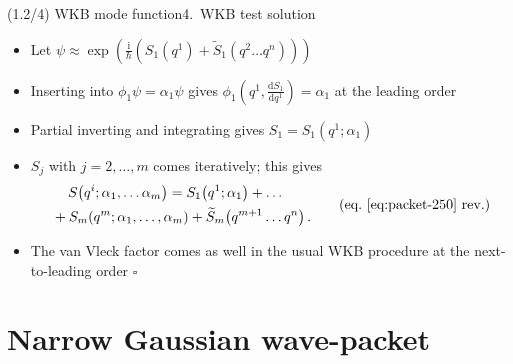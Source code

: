 \documentclass[mathserif]{beamer}
\newcommand{\rbr}[1]{{\left(#1\right)}}
\newcommand{\rfun}[2]{#1\mathopen{}\left(#2\right)\mathclose{}}
\newcommand{\frde}[2]{{\frac{\dif{#1}}{\dif{#2}}}}
\newcommand{\dif}{\mathrm{d}}
\newcommand\mi{\mathrm{i}} %
\begin{document}
\begin{frame}{(1.2/4) WKB mode function}{4.\ WKB test solution}
\begin{itemize}
    \item Let $\psi \approx \rfun{\exp}{\frac{\mi}{\hslash} \rbr{\rfun{S_1}{q^1} + \rfun{\widetilde{S}_1}{q^2 \ldots q^n}}}$

    \item Inserting into $\phi_1 \psi = \alpha_1 \psi$ gives $\rfun{\phi_1}{q^1, \frde{S_1}{q^1}} = \alpha_1$ at the leading order

    \item Partial inverting and integrating gives $S_1 = \rfun{S_1}{q^1; \alpha_1}$

    \item $S_j$ with $j = 2, \ldots, m$ comes iteratively; this gives
    \begin{align}
    \begin{split}
    &\quad\,\rfun{S}{q^i; \alpha_1, \ldots \alpha_m} = \rfun{S_1}{q^1; \alpha_1} + %
    \ldots
    \\
    &+ \rfun{S_m}{q^m; \alpha_1, \ldots, \alpha_m}
    +
    \rfun{\widetilde{S}_{m}}{q^{m+1}\ldots q^n}\,. %
\end{split}
\tag{eq.\ \eqref{eq:packet-250} rev.}
\end{align}

    \item
    The van Vleck factor comes as well in the usual WKB procedure at the next-to-leading order \hfill $\square$

\end{itemize}

\end{frame}

\section{Narrow Gaussian wave-packet}

\end{document}
